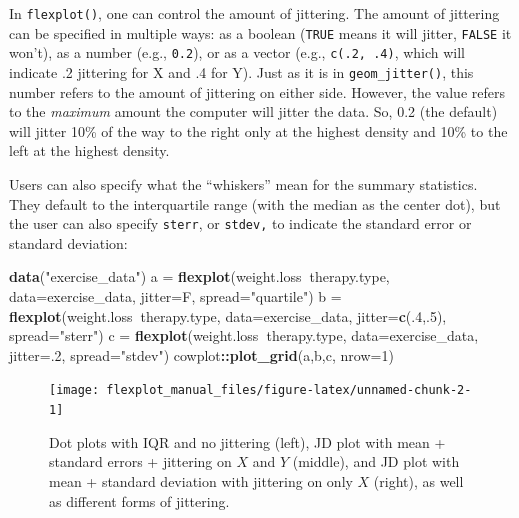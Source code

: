 \documentclass[,]{book}
\newenvironment{Shaded}{\begin{snugshade}}{\end{snugshade}}
\newcommand{\KeywordTok}[1]{\textcolor[rgb]{0.13,0.29,0.53}{\textbf{#1}}}
\newcommand{\DataTypeTok}[1]{\textcolor[rgb]{0.13,0.29,0.53}{#1}}
\newcommand{\DecValTok}[1]{\textcolor[rgb]{0.00,0.00,0.81}{#1}}
\newcommand{\StringTok}[1]{\textcolor[rgb]{0.31,0.60,0.02}{#1}}
\newcommand{\OperatorTok}[1]{\textcolor[rgb]{0.81,0.36,0.00}{\textbf{#1}}}
\newcommand{\NormalTok}[1]{#1}
\begin{document}
In \texttt{flexplot()}, one can control the amount of jittering. The
amount of jittering can be specified in multiple ways: as a boolean
(\texttt{TRUE} means it will jitter, \texttt{FALSE} it won't), as a
number (e.g., \texttt{0.2}), or as a vector (e.g., \texttt{c(.2,\ .4)},
which will indicate .2 jittering for X and .4 for Y). Just as it is in
\texttt{geom\_jitter()}, this number refers to the amount of jittering
on either side. However, the value refers to the \emph{maximum} amount
the computer will jitter the data. So, 0.2 (the default) will jitter
10\% of the way to the right only at the highest density and 10\% to the
left at the highest density.

Users can also specify what the ``whiskers'' mean for the summary
statistics. They default to the interquartile range (with the median as
the center dot), but the user can also specify \texttt{sterr}, or
\texttt{stdev,} to indicate the standard error or standard deviation:

\begin{Shaded}
\begin{Highlighting}[]
\KeywordTok{data}\NormalTok{(}\StringTok{"exercise_data"}\NormalTok{)}
\NormalTok{a =}\StringTok{ }\KeywordTok{flexplot}\NormalTok{(weight.loss}\OperatorTok{~}\NormalTok{therapy.type, }\DataTypeTok{data=}\NormalTok{exercise_data, }
             \DataTypeTok{jitter=}\NormalTok{F, }\DataTypeTok{spread=}\StringTok{"quartile"}\NormalTok{)}
\NormalTok{b =}\StringTok{ }\KeywordTok{flexplot}\NormalTok{(weight.loss}\OperatorTok{~}\NormalTok{therapy.type, }\DataTypeTok{data=}\NormalTok{exercise_data, }
             \DataTypeTok{jitter=}\KeywordTok{c}\NormalTok{(.}\DecValTok{4}\NormalTok{,.}\DecValTok{5}\NormalTok{), }\DataTypeTok{spread=}\StringTok{"sterr"}\NormalTok{)}
\NormalTok{c =}\StringTok{ }\KeywordTok{flexplot}\NormalTok{(weight.loss}\OperatorTok{~}\NormalTok{therapy.type, }\DataTypeTok{data=}\NormalTok{exercise_data, }
             \DataTypeTok{jitter=}\NormalTok{.}\DecValTok{2}\NormalTok{, }\DataTypeTok{spread=}\StringTok{"stdev"}\NormalTok{)}
\NormalTok{cowplot}\OperatorTok{::}\KeywordTok{plot_grid}\NormalTok{(a,b,c, }\DataTypeTok{nrow=}\DecValTok{1}\NormalTok{)}
\end{Highlighting}
\end{Shaded}

\begin{figure}

{\centering \texttt{[image: flexplot\_manual\_files/figure-latex/unnamed-chunk-2-1]} 

}

\caption{Dot plots with IQR and no jittering (left), JD plot with mean + standard errors + jittering on $X$ and $Y$ (middle), and JD plot with mean + standard deviation with jittering on only $X$ (right), as well as different forms of jittering.}\label{fig:unnamed-chunk-2}
\end{figure}
\end{document}
